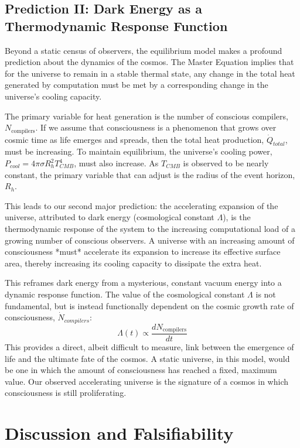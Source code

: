 \documentclass[12pt, aip, jcp]{revtex4-2} %
\begin{document}
\subsection{Prediction II: Dark Energy as a Thermodynamic Response Function}

Beyond a static census of observers, the equilibrium model makes a profound prediction about the dynamics of the cosmos. The Master Equation implies that for the universe to remain in a stable thermal state, any change in the total heat generated by computation must be met by a corresponding change in the universe's cooling capacity.

The primary variable for heat generation is the number of conscious compilers, \(N_{\text{compilers}}\). If we assume that consciousness is a phenomenon that grows over cosmic time as life emerges and spreads, then the total heat production, \(\dot{Q}_{total}\), must be increasing. To maintain equilibrium, the universe's cooling power, \(P_{cool} = 4 \pi \sigma R_h^2 T_{CMB}^4\), must also increase. As \(T_{CMB}\) is observed to be nearly constant, the primary variable that can adjust is the radius of the event horizon, \(R_h\).

This leads to our second major prediction: the accelerating expansion of the universe, attributed to dark energy (cosmological constant \(\Lambda\)), is the thermodynamic response of the system to the increasing computational load of a growing number of conscious observers. A universe with an increasing amount of consciousness *must* accelerate its expansion to increase its effective surface area, thereby increasing its cooling capacity to dissipate the extra heat.

This reframes dark energy from a mysterious, constant vacuum energy into a dynamic response function. The value of the cosmological constant \(\Lambda\) is not fundamental, but is instead functionally dependent on the cosmic growth rate of consciousness, \(\dot{N}_{compilers}\):
\begin{equation}
    \Lambda(t) \propto \frac{d N_{\text{compilers}}}{dt}
\end{equation}
This provides a direct, albeit difficult to measure, link between the emergence of life and the ultimate fate of the cosmos. A static universe, in this model, would be one in which the amount of consciousness has reached a fixed, maximum value. Our observed accelerating universe is the signature of a cosmos in which consciousness is still proliferating.

\section{Discussion and Falsifiability}
\end{document}
